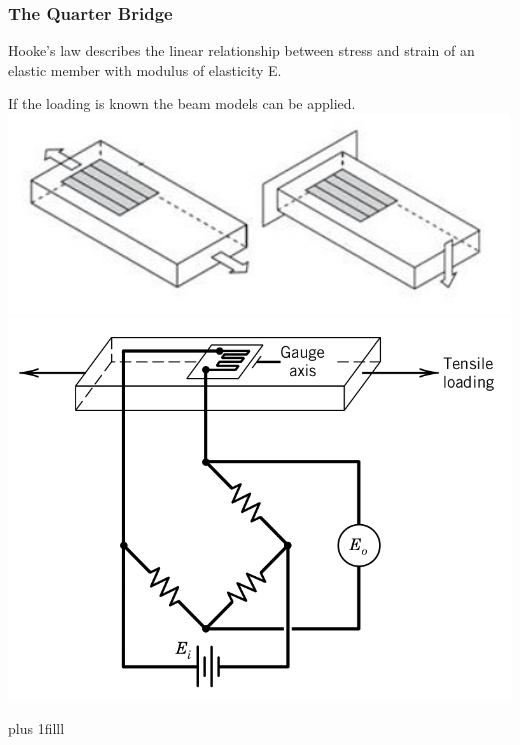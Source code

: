 \documentclass[fleqn]{beamer} %
\newcommand{\sectionIIsubsectionItitle}{The Quarter Bridge}
\newcommand{\btVFill}{\vskip0pt plus 1filll}
\begin{document}
			\begin{frame}[label=sectionIIsubsectionI]
				\frametitle{\sectionIIsubsectionItitle} \scriptsize

				\bigskip	

				Hooke's law describes the linear relationship between stress and strain of an elastic member with modulus of elasticity E.\vspc
{} \vspc
\begin{multicols}{2}
If the loading is known the beam models can be applied. \vspc
\includegraphics[scale=.30]{images/simple_loading.png} \includegraphics[scale=.18]{images/gauged_beam_bridge.png} \vspace{15mm} 
\end{multicols}

				\btVFill
				
		
			\end{frame}
\end{document}
